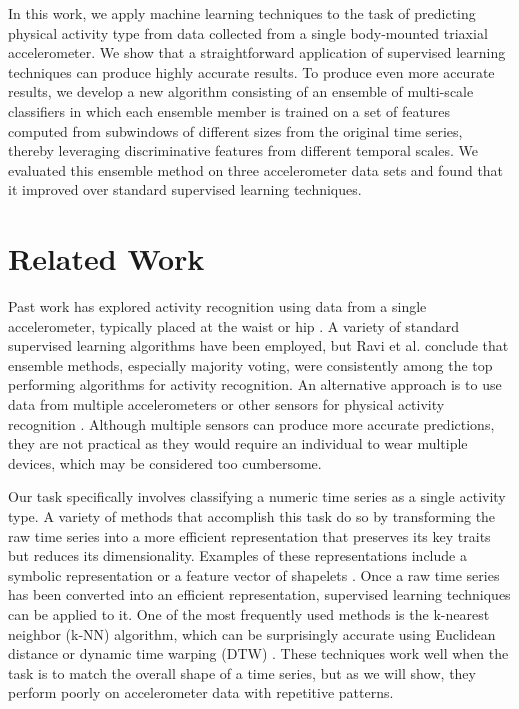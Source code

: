 \documentclass[letterpaper]{article}
\begin{document}
In this work, we apply machine learning techniques to the task of predicting physical activity type from data collected from a single body-mounted triaxial accelerometer. We show that a straightforward application of supervised learning techniques can produce highly accurate results. To produce even more accurate results, we develop a new algorithm consisting of an ensemble of multi-scale classifiers in which each ensemble member is trained on a set of features computed from subwindows of different sizes from the original time series, thereby leveraging discriminative features from different temporal scales. We evaluated this ensemble method on three accelerometer data sets and found that it improved over standard supervised learning techniques.

\section{Related Work}
Past work has explored activity recognition using data from a single accelerometer, typically placed at the waist or hip \cite{staudenmayer2009artificial,bonomi2009detection}. A variety of standard supervised learning algorithms have been employed, but Ravi et al.  conclude that ensemble methods, especially majority voting, were consistently among the top performing algorithms for activity recognition. An alternative approach is to use data from multiple accelerometers or other sensors for physical activity recognition \cite{BaoIntille:04}. Although multiple sensors can produce more accurate predictions, they are not practical as they would require an individual to wear multiple devices, which may be considered too cumbersome.

Our task specifically involves classifying a numeric time series as a single activity type. A variety of methods that accomplish this task \cite{XPK:10,wang2010experimental} do so by transforming the raw time series into a more efficient representation that preserves its key traits but reduces its dimensionality. Examples of these representations include a symbolic representation \cite{lin2003symbolic} or a feature vector of shapelets \cite{ye2009time}. Once a raw time series has been converted into an efficient representation, supervised learning techniques can be applied to it. One of the most frequently used methods is the k-nearest neighbor (k-NN) algorithm, which can be surprisingly accurate using Euclidean distance  \cite{keogh2003need} or dynamic time warping (DTW) \cite{wang2010experimental}.  These techniques work well when the task is to match the overall shape of a time series, but as we will show, they perform poorly on accelerometer data with repetitive patterns.
\end{document}
